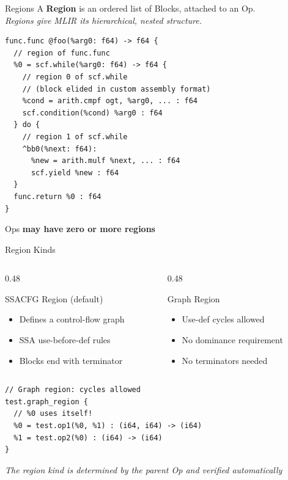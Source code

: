 \begin{frame}[fragile]{Regions}
  A \textbf{\textcolor{mainAccent}{Region}} is an ordered list of Blocks, attached to an Op.\\
  \textit{\small Regions give MLIR its hierarchical, nested structure.}

\begin{lstlisting}[language=none,basicstyle=\ttfamily\small]
func.func @foo(%arg0: f64) -> f64 {
  // region of func.func
  %0 = scf.while(%arg0: f64) -> f64 {
    // region 0 of scf.while
    // (block elided in custom assembly format)
    %cond = arith.cmpf ogt, %arg0, ... : f64
    scf.condition(%cond) %arg0 : f64
  } do {
    // region 1 of scf.while
    ^bb0(%next: f64):
      %new = arith.mulf %next, ... : f64
      scf.yield %new : f64
  }
  func.return %0 : f64
}
\end{lstlisting}

  Ops \textbf{\textcolor{mainAccent}{may have zero or more regions}}
\end{frame}


\begin{frame}[fragile]{Region Kinds}
  \begin{columns}
    \begin{column}{0.48\textwidth}
      \begin{block}{SSACFG Region (default)}
        \begin{itemize}
          \item Defines a control-flow graph
          \item SSA use-before-def rules
          \item Blocks end with terminator
        \end{itemize}
      \end{block}
    \end{column}
    \begin{column}{0.48\textwidth}
      \begin{exampleblock}{Graph Region}
        \begin{itemize}
          \item Use-def cycles allowed
          \item No dominance requirement
          \item No terminators needed
        \end{itemize}
      \end{exampleblock}
    \end{column}
  \end{columns}

  \bigskip
\begin{lstlisting}[language=none,basicstyle=\ttfamily\small]
// Graph region: cycles allowed
test.graph_region {
  // %0 uses itself!
  %0 = test.op1(%0, %1) : (i64, i64) -> (i64)
  %1 = test.op2(%0) : (i64) -> (i64)
}
\end{lstlisting}

  \textit{\small The region kind is determined by the parent Op and verified
  automatically}
\end{frame}


